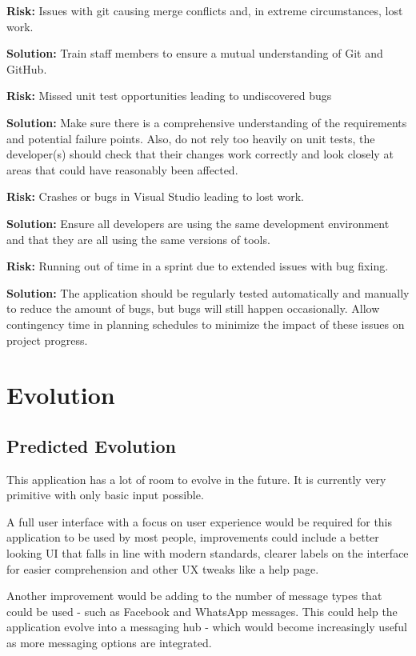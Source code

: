 \documentclass[a4paper]{article}
\begin{document}
\textbf{Risk:} Issues with git causing merge conflicts and, in extreme circumstances, lost work.

\textbf{Solution:} Train staff members to ensure a mutual understanding of Git and GitHub.

\textbf{Risk:} Missed unit test opportunities leading to undiscovered bugs

\textbf{Solution:} Make sure there is a comprehensive understanding of the requirements and potential failure points. Also, do not rely too heavily on unit tests, the developer(s) should check that their changes work correctly and look closely at areas that could have reasonably been affected.

\textbf{Risk:} Crashes or bugs in Visual Studio leading to lost work.

\textbf{Solution:} Ensure all developers are using the same development environment and that they are all using the same versions of tools.

\textbf{Risk:} Running out of time in a sprint due to extended issues with bug fixing.

\textbf{Solution:} The application should be regularly tested automatically and manually to reduce the amount of bugs, but bugs will still happen occasionally. Allow contingency time in planning schedules to minimize the impact of these issues on project progress.

\newpage
\section{Evolution}
\label{sec:evolution}
\subsection{Predicted Evolution}
This application has a lot of room to evolve in the future. It is currently very primitive with only basic input possible.

A full user interface with a focus on user experience would be required for this application to be used by most people, improvements could include a better looking UI that falls in line with modern standards, clearer labels on the interface for easier comprehension and other UX tweaks like a help page.

Another improvement would be adding to the number of message types that could be used - such as Facebook and WhatsApp messages. This could help the application evolve into a messaging hub - which would become increasingly useful as more messaging options are integrated.
\end{document}
